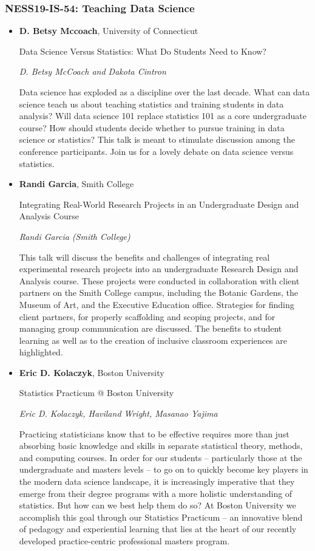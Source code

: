 \subsubsection*{NESS19-IS-54: Teaching Data Science}

\begin{itemize}
\item \textbf{D. Betsy Mccoach}, University of Connecticut

Data Science Versus Statistics: What Do Students Need to Know?

\emph{\footnotesize D. Betsy McCoach and Dakota Cintron}

Data science has exploded as a discipline over the last decade. What can data science teach us about teaching statistics and training students in data analysis? Will data science 101 replace statistics 101 as a core undergraduate course? How should students decide whether to pursue training in data science or statistics? This talk is meant to stimulate discussion among the conference participants. Join us for a lovely debate on data science versus statistics.

\item \textbf{Randi Garcia}, Smith College

Integrating Real-World Research Projects in an Undergraduate Design and Analysis Course

\emph{\footnotesize Randi Garcia (Smith College)}

This talk will discuss the benefits and challenges of integrating real experimental research projects into an undergraduate Research Design and Analysis course. These projects were conducted in collaboration with client partners on the Smith College campus, including the Botanic Gardens, the Museum of Art, and the Executive Education office. Strategies for finding client partners, for properly scaffolding and scoping projects, and for managing group communication are discussed. The benefits to student learning as well as to the creation of inclusive classroom experiences are highlighted.

\item \textbf{Eric D. Kolaczyk}, Boston University

Statistics Practicum @ Boston University

\emph{\footnotesize Eric D. Kolaczyk, Haviland Wright, Masanao Yajima}

Practicing statisticians know that to be effective requires more than just absorbing basic knowledge and skills in separate statistical theory, methods, and computing courses.  In order for our students -- particularly those at the undergraduate and masters levels -- to go on to quickly become key players in the modern data science landscape, it is increasingly imperative that they emerge from their degree programs with a more holistic understanding of statistics.  But how can we best help them do so?  At Boston University we accomplish this goal through our Statistics Practicum -- an innovative blend of pedagogy and experiential learning that lies at the heart of our recently developed practice-centric professional masters program.

\end{itemize}

